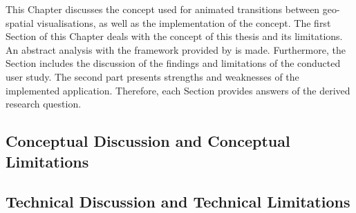 \cbstart
This Chapter discusses the concept used for animated transitions between geo-spatial visualisations, as well as the implementation of the concept.
The first Section of this Chapter deals with the concept of this thesis and its limitations. An abstract analysis with the framework provided by \citeauthor{Munzner2014} is made. Furthermore, the Section includes the discussion of the findings and limitations of the conducted user study. The second part presents strengths and weaknesses of the implemented application. Therefore, each Section provides answers of the derived research question.
\cbend

\subsection{Conceptual Discussion and Conceptual Limitations}


\subsection{Technical Discussion and Technical Limitations}

